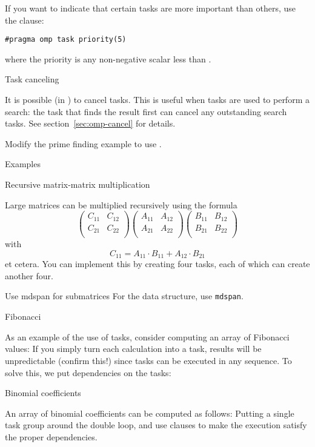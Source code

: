 If you want to indicate that certain tasks are more important
than others, use the  clause:
\begin{lstlisting}
#pragma omp task priority(5)
\end{lstlisting}
where the priority is any non-negative scalar
less than .

 {Task canceling}

It is possible (in ) to cancel
tasks. This is useful when tasks are used to perform a search: the
task that finds the result first can cancel any outstanding search
tasks.
See section~\ref{sec:omp-cancel} for details.

\begin{exercise}
  Modify the prime finding example to use .
\end{exercise}

 {Examples}

 {Recursive matrix-matrix multiplication}

Large matrices can be multiplied recursively using the formula
\[ 
\begin{pmatrix}
  C_{11}&C_{12}\\ C_{21}&C_{22}\\
\end{pmatrix}
\begin{pmatrix}
  A_{11}&A_{12}\\ A_{21}&A_{22}\\
\end{pmatrix}
\begin{pmatrix}
  B_{11}&B_{12}\\ B_{21}&B_{22}\\
\end{pmatrix}
\]
with
\[ C_{11} = A_{11}\cdot B_{11} + A_{12}\cdot B_{21} \]
et cetera.
You can implement this by creating four tasks, each of which can create another four.

\begin{cppnote}{Use mdspan for submatrices}
  For the data structure, use \lstinline{mdspan}.
\end{cppnote}

 {Fibonacci}

As an example of the use of tasks, consider computing an array of Fibonacci values:
%
%
If you simply turn each calculation into a task, results will be
unpredictable (confirm this!) since tasks can be executed in any sequence.
To solve this, we put dependencies on the tasks:
%

 {Binomial coefficients}

\begin{exercise}
  An array of binomial coefficients can be computed as follows:
  Putting a single task group around the double loop, and use
   clauses to make the execution satisfy the proper dependencies.
\end{exercise}

